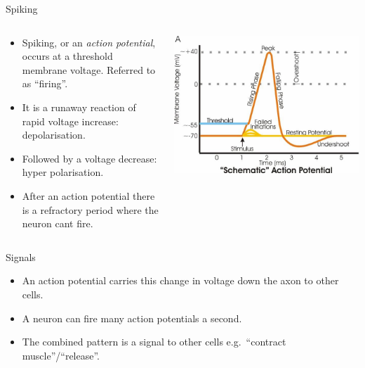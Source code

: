 \documentclass[
  ignorenonframetext,
]{beamer}
\begin{document}
\begin{frame}{Spiking}
\protect\hypertarget{spiking}{}
\begin{columns}[T]
\begin{column}{0.5\textwidth}
\begin{itemize}
\item
  Spiking, or an \emph{action potential}, occurs at a threshold membrane
  voltage. Referred to as ``firing''.
\item
  It is a runaway reaction of rapid voltage increase: depolarisation.
\item
  Followed by a voltage decrease: hyper polarisation.
\item
  After an action potential there is a refractory period where the
  neuron cant fire.
\end{itemize}
\end{column}

\begin{column}{0.5\textwidth}
\includegraphics{./images/action_potential.jpg}
\end{column}
\end{columns}
\end{frame}

\begin{frame}{Signals}
\protect\hypertarget{signals}{}
\begin{itemize}
\item
  An action potential carries this change in voltage down the axon to
  other cells.
\item
  A neuron can fire many action potentials a second.
\item
  The combined pattern is a signal to other cells e.g.~``contract
  muscle''/``release''.
\end{itemize}
\end{frame}
\end{document}

